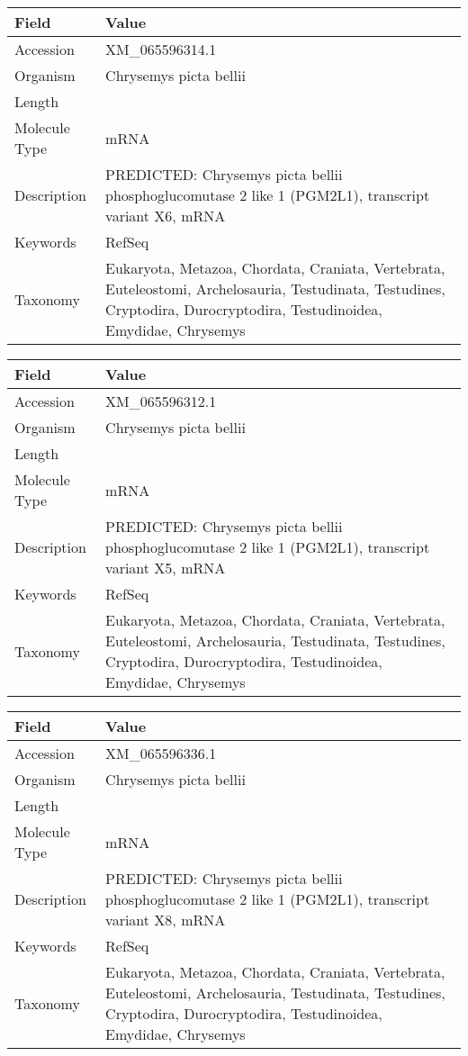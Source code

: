 \documentclass[10pt]{article}
\begin{document}
{\footnotesize
\begin{longtable}{>{\raggedright\arraybackslash}p{4.5cm} >{\raggedright\arraybackslash}p{11.5cm}}
\textbf{Field} & \textbf{Value} \\
\hline
Accession & XM\_065596314.1 \\
Organism & Chrysemys picta bellii \\
Length & 7945 \\
Molecule Type & mRNA \\
Description & PREDICTED: Chrysemys picta bellii phosphoglucomutase 2 like 1 (PGM2L1), transcript variant X6, mRNA \\
Keywords & RefSeq \\
Taxonomy & Eukaryota, Metazoa, Chordata, Craniata, Vertebrata, Euteleostomi, Archelosauria, Testudinata, Testudines, Cryptodira, Durocryptodira, Testudinoidea, Emydidae, Chrysemys \\
\end{longtable}
}

{\footnotesize
\begin{longtable}{>{\raggedright\arraybackslash}p{4.5cm} >{\raggedright\arraybackslash}p{11.5cm}}
\textbf{Field} & \textbf{Value} \\
\hline
Accession & XM\_065596312.1 \\
Organism & Chrysemys picta bellii \\
Length & 13405 \\
Molecule Type & mRNA \\
Description & PREDICTED: Chrysemys picta bellii phosphoglucomutase 2 like 1 (PGM2L1), transcript variant X5, mRNA \\
Keywords & RefSeq \\
Taxonomy & Eukaryota, Metazoa, Chordata, Craniata, Vertebrata, Euteleostomi, Archelosauria, Testudinata, Testudines, Cryptodira, Durocryptodira, Testudinoidea, Emydidae, Chrysemys \\
\end{longtable}
}

{\footnotesize
\begin{longtable}{>{\raggedright\arraybackslash}p{4.5cm} >{\raggedright\arraybackslash}p{11.5cm}}
\textbf{Field} & \textbf{Value} \\
\hline
Accession & XM\_065596336.1 \\
Organism & Chrysemys picta bellii \\
Length & 7502 \\
Molecule Type & mRNA \\
Description & PREDICTED: Chrysemys picta bellii phosphoglucomutase 2 like 1 (PGM2L1), transcript variant X8, mRNA \\
Keywords & RefSeq \\
Taxonomy & Eukaryota, Metazoa, Chordata, Craniata, Vertebrata, Euteleostomi, Archelosauria, Testudinata, Testudines, Cryptodira, Durocryptodira, Testudinoidea, Emydidae, Chrysemys \\
\end{longtable}
}
\end{document}
